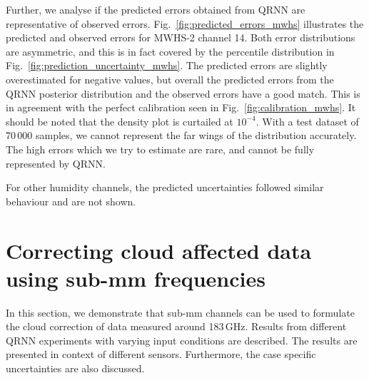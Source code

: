 \documentclass[amt, manuscript]{copernicus}
\begin{document}
Further, we analyse if the  predicted errors obtained from QRNN are representative of observed errors. Fig.~\ref{fig:predicted_errors_mwhs} illustrates the predicted and observed errors for MWHS-2 channel 14. Both error distributions are asymmetric, and this is in fact covered by the percentile distribution  in Fig.~\ref{fig:prediction_uncertainty_mwhs}. The predicted errors are slightly overestimated for negative values, but overall the predicted errors from the QRNN posterior distribution and the observed errors have a good match. This is in agreement with the perfect calibration seen in Fig.~\ref{fig:calibration_mwhs}. It should be noted that the density plot is curtailed at $10^{-4}$. With a test dataset of 70\,000 samples, we cannot represent the far wings of the distribution accurately. The high errors which we try to estimate are rare, and cannot be fully represented by QRNN. 

For other humidity channels, the predicted uncertainties followed similar
behaviour and are not shown.


\section{Correcting cloud affected data using sub-mm frequencies}
\label{qrnn_ici}
In this section, we demonstrate that sub-mm channels can be used to formulate the cloud correction of data measured around 183\,GHz. Results from different QRNN experiments with varying input conditions are described. The results are presented in context of different sensors. Furthermore, the case specific uncertainties are also discussed.
\end{document}
